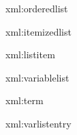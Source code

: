 
\startxmlsetups xml:orderedlist
	\startitemize[n]
	\stopitemize
\stopxmlsetups

\startxmlsetups xml:itemizedlist
	\startitemize[1]
	\stopitemize
\stopxmlsetups

\startxmlsetups xml:listitem
	\item
\stopxmlsetups


\startxmlsetups xml:variablelist
\stopxmlsetups

\startxmlsetups xml:term
\stopxmlsetups

\startxmlsetups xml:varlistentry
	\stopvariablelist
\stopxmlsetups

